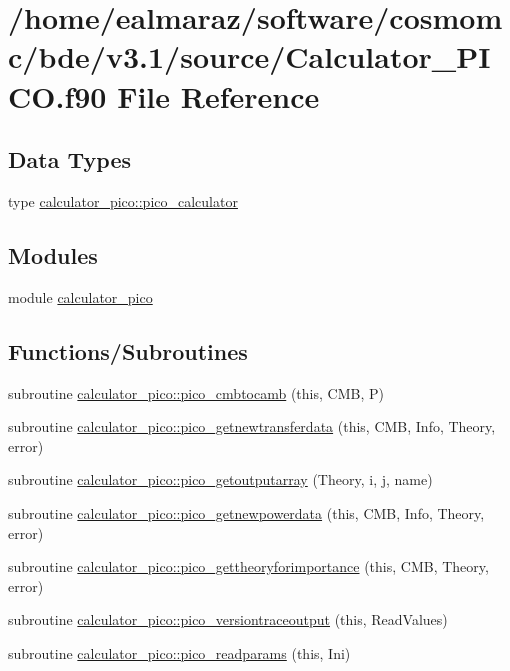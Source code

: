 \hypertarget{Calculator__PICO_8f90}{}\section{/home/ealmaraz/software/cosmomc/bde/v3.1/source/\+Calculator\+\_\+\+P\+I\+CO.f90 File Reference}
\label{Calculator__PICO_8f90}
\subsection*{Data Types}
\begin{DoxyCompactItemize}
\item 
type \mbox{\hyperlink{structcalculator__pico_1_1pico__calculator}{calculator\+\_\+pico\+::pico\+\_\+calculator}}
\end{DoxyCompactItemize}
\subsection*{Modules}
\begin{DoxyCompactItemize}
\item 
module \mbox{\hyperlink{namespacecalculator__pico}{calculator\+\_\+pico}}
\end{DoxyCompactItemize}
\subsection*{Functions/\+Subroutines}
\begin{DoxyCompactItemize}
\item 
subroutine \mbox{\hyperlink{namespacecalculator__pico_a3b8f1f50b300f4773dc55711f55573f6}{calculator\+\_\+pico\+::pico\+\_\+cmbtocamb}} (this, C\+MB, P)
\item 
subroutine \mbox{\hyperlink{namespacecalculator__pico_a76b2c99179137a67bf5deffecbe7a883}{calculator\+\_\+pico\+::pico\+\_\+getnewtransferdata}} (this, C\+MB, Info, Theory, error)
\item 
subroutine \mbox{\hyperlink{namespacecalculator__pico_adaa7c5af46424e51b4ff7c68520348c2}{calculator\+\_\+pico\+::pico\+\_\+getoutputarray}} (Theory, i, j, name)
\item 
subroutine \mbox{\hyperlink{namespacecalculator__pico_a45cf2dcc102d6d731b105dcc2b985c04}{calculator\+\_\+pico\+::pico\+\_\+getnewpowerdata}} (this, C\+MB, Info, Theory, error)
\item 
subroutine \mbox{\hyperlink{namespacecalculator__pico_abec990f2804cd52fd2f1c7aab45c7fe8}{calculator\+\_\+pico\+::pico\+\_\+gettheoryforimportance}} (this, C\+MB, Theory, error)
\item 
subroutine \mbox{\hyperlink{namespacecalculator__pico_ad5f92039b6c79eac4c4aeb00e53da084}{calculator\+\_\+pico\+::pico\+\_\+versiontraceoutput}} (this, Read\+Values)
\item 
subroutine \mbox{\hyperlink{namespacecalculator__pico_a974f29861363802129a96c29e70ea03e}{calculator\+\_\+pico\+::pico\+\_\+readparams}} (this, Ini)
\end{DoxyCompactItemize}
